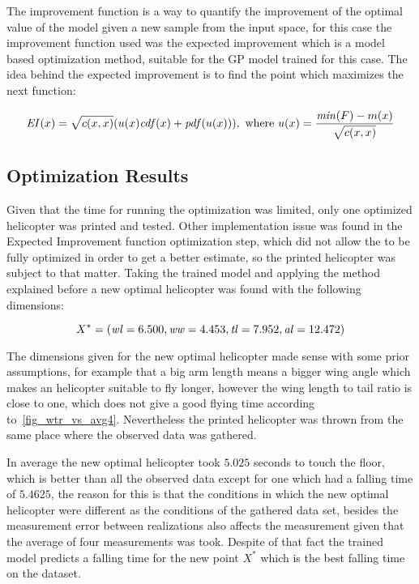 The improvement function is a way to quantify the improvement of the optimal value of the model given a new sample from the input space, for this case the improvement function used was the expected improvement which is a model based optimization method, suitable for the GP model trained for this case. The idea behind the expected improvement is to find the point which maximizes the next function:

\begin{equation*}
	\mathit{EI}(x) = \sqrt{c(x,x)}(u(x) \mathit{cdf}(x) + \mathit{pdf}(u(x))), \\
	\text{ where } u(x) = \frac{\mathit{min}(F) - m(x)}{\sqrt{c(x,x)}}
\end{equation*}

\subsection{Optimization Results}

Given that the time for running the optimization was limited, only one optimized
helicopter was printed and tested. Other implementation issue was found in the
Expected Improvement function optimization step, which did not allow the 
to be fully optimized in order to get a better estimate, so the printed
helicopter was subject to that matter. Taking the trained model and applying the
method explained before a new optimal helicopter was found with the following
dimensions:

\begin{equation*}
	X^* = (\mathit{wl} = 6.500, \mathit{ww} = 4.453, \mathit{tl} = 7.952, \mathit{al} = 12.472)
\end{equation*}

The dimensions given for the new optimal helicopter made sense with some prior
assumptions, for example that a big arm length means a bigger wing angle which
makes an helicopter suitable to fly longer, however the wing length to tail
ratio is close to one, which does not give a good flying time according
to~\cref{fig_wtr_vs_avg4}. Nevertheless the printed helicopter was thrown from
the same place where the observed data was gathered.

In average the new optimal helicopter took $5.025$ seconds to touch the floor,
which is better than all the observed data except for one which had a falling
time of $5.4625$, the reason for this is that the conditions in which the new
optimal helicopter were different as the conditions of the gathered data set,
besides the measurement error between realizations also affects the measurement
given that the average of four measurements was took. Despite of that fact the
trained model predicts a falling time for the new point $X^*$ which is the best
falling time on the dataset.
